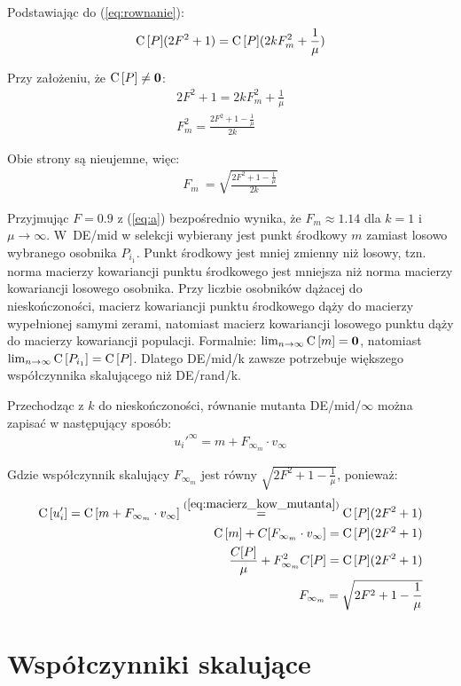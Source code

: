 \documentclass[a4paper,onecolumn,oneside,12pt,wide,floatssmall]{mwrep}
\def\C{{\rm C}\,}
\theoremstyle{definition}
\theoremstyle{plain}%
\theoremstyle{remark}
\begin{document}
Podstawiając do (\ref{eq:rownanie}):
\begin{align*}
\C[P](2F^2 + 1) = \C[P](2kF_m^2 + \frac{1}{\mu})
\end{align*}

Przy założeniu, że $\C[P] \neq \textbf{0}$:
\begin{align*}
2F^2 + 1 = 2kF_m^2 + \frac{1}{\mu} \\
F_m^2 = \frac{2F^2 + 1 - \frac{1}{\mu}}{2k}
\end{align*}

Obie strony są nieujemne, więc:
\begin{align} \label{eq:a}
F_m\ = \sqrt{\frac{2F^2 + 1 - \frac{1}{\mu}}{2k}}
\end{align}

Przyjmując $F=0.9$ z (\ref{eq:a}) bezpośrednio wynika, że $F_m \approx 1.14$ dla $k=1$ i $\mu\to\infty$.
W~DE/mid w selekcji wybierany jest punkt środkowy $m$ zamiast losowo wybranego osobnika $P_{i_1}$.
Punkt środkowy jest mniej zmienny niż losowy, 
tzn. norma macierzy kowariancji punktu środkowego jest mniejsza niż norma macierzy kowariancji 
losowego osobnika. Przy liczbie osobników dążacej do nieskończoności, macierz kowariancji
punktu środkowego dąży do macierzy wypełnionej samymi zerami, natomiast macierz kowariancji
losowego punktu dąży do macierzy kowariancji populacji. Formalnie: 
$\lim_{n\to\infty} \C[m] = \textbf{0}$, natomiast $\lim_{n\to\infty} \C[P_{i_1}] = \C[P]$.
Dlatego DE/mid/k zawsze potrzebuje większego współczynnika skalującego niż DE/rand/k.

Przechodząc z $k$ do nieskończoności, równanie mutanta DE/mid/$\infty$ można zapisać
w następujący sposób:
\begin{align*}
u_i'^\infty = m + F_{\infty_m} \cdot v_\infty
\end{align*}

Gdzie współczynnik skalujący $F_{\infty_m}$ jest równy $\sqrt{2F^2 + 1 - \frac{1}{\mu}}$, ponieważ:
\begin{align*}
\C[u_i'] = \C[m + F_{\infty_m} \cdot v_\infty] \overset{(\ref{eq:macierz_kow_mutanta})}{=} \C[P](2F^2 + 1) \\
\C[m] + C[F_{\infty_m} \cdot v_\infty] = \C[P](2F^2 + 1) \\
\frac{C[P]}{\mu} + F_{\infty_m}^2 C[P] = \C[P](2F^2 + 1) \\
F_{\infty_m} = \sqrt{2F^2 + 1 - \frac{1}{\mu}}
\end{align*}

\section{Współczynniki skalujące}
\end{document}

